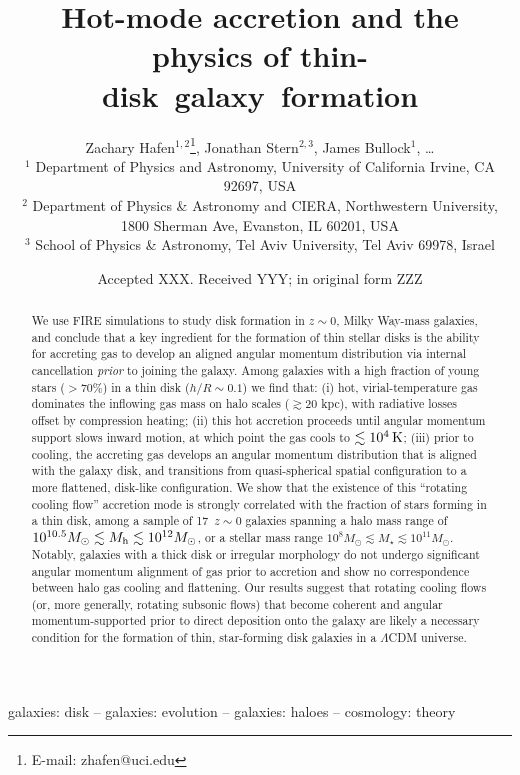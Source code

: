 \documentclass[fleqn,usenatbib]{mnras}
\title[Rotating cooling flows and thin galactic disks]{Hot-mode accretion and the physics of thin-disk~galaxy~formation}
\author[Hafen, Stern, Bullock et al.]{
Zachary Hafen$^{1,2}$\thanks{E-mail: zhafen@uci.edu},
Jonathan Stern$^{2,3}$,
James Bullock$^{1}$,
\ldots
\\
$^1$ Department of Physics and Astronomy, University of California Irvine, CA 92697, USA \\
$^2$ Department of Physics \& Astronomy and CIERA, Northwestern University, 1800 Sherman Ave, Evanston, IL 60201, USA \\
$^3$ School of Physics \& Astronomy, Tel Aviv University, Tel Aviv 69978, Israel
}
\date{Accepted XXX. Received YYY; in original form ZZZ}
\newcommand{\Nsample}{17}
\begin{document}
\label{firstpage}
\pagerange{\pageref{firstpage}--\pageref{lastpage}}
\maketitle

\begin{abstract}
We use FIRE simulations to study disk formation in $z\sim 0$, Milky Way-mass galaxies, and conclude that a key ingredient for the formation of thin stellar disks is the ability for accreting gas to develop an aligned angular momentum distribution via internal cancellation \textit{prior} to joining the galaxy.
Among galaxies with a high fraction of young stars ($>70\%$) in a thin disk ($h/R \sim 0.1$) we find that:
(i) hot, virial-temperature gas dominates the inflowing gas mass on halo scales ($\gtrsim 20$ kpc), with radiative losses offset by compression heating;
(ii) this hot accretion proceeds until angular momentum support slows inward motion, at which point the gas cools to $\lesssim10^4\,{\rm K}$;
(iii) prior to cooling, the accreting gas develops an angular momentum distribution that is aligned with the galaxy disk, and transitions from quasi-spherical spatial configuration to a more flattened, disk-like configuration.
We show that the existence of this ``rotating cooling flow'' accretion mode is strongly correlated with the fraction of stars forming in a thin disk, among a sample of \Nsample\ $z\sim0$ galaxies spanning a halo mass range of $10^{10.5} M_\odot \lesssim M_{\rm h} \lesssim 10^{12} M_\odot$, or a stellar mass range $10^8 M_\odot \lesssim M_\star \lesssim 10^{11} M_\odot$.
Notably, galaxies with a thick disk or irregular morphology do not undergo significant angular momentum alignment of gas prior to accretion and show no correspondence between halo gas cooling and flattening.
Our results suggest that rotating cooling flows (or, more generally, rotating subsonic flows) that become coherent and angular momentum-supported prior to direct deposition onto the galaxy are likely a necessary condition for the formation of thin, star-forming disk galaxies in a $\Lambda$CDM universe.
\end{abstract}

\begin{keywords}
galaxies: disk -- galaxies: evolution -- galaxies: haloes -- cosmology: theory
\end{keywords}
\end{document}
